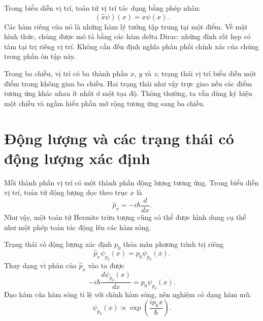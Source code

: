 Trong biểu diễn vị trí, toán tử vị trí tác dụng bằng phép nhân:
\begin{equation}
(\hat x\psi)(x)=x\psi(x).
\end{equation}
Các hàm riêng của nó là những hàm lý tưởng tập trung tại một điểm. Về mặt hình thức, chúng được mô tả bằng các hàm delta Dirac: những đỉnh rất hẹp có tâm tại trị riêng vị trí. Không cần đến định nghĩa phân phối chính xác của chúng trong phần ôn tập này.

Trong ba chiều, vị trí có ba thành phần \(x\), \(y\) và \(z\); trạng thái vị trí biểu diễn một điểm trong không gian ba chiều. Hai trạng thái như vậy trực giao nếu các điểm tương ứng khác nhau ít nhất ở một tọa độ. Thông thường, ta vẫn dùng ký hiệu một chiều và ngầm hiểu phần mở rộng tương ứng sang ba chiều.

\section{Động lượng và các trạng thái có động lượng xác định}

Mỗi thành phần vị trí có một thành phần động lượng tương ứng. Trong biểu diễn vị trí, toán tử động lượng dọc theo trục \(x\) là
\begin{equation}
\hat p_x=-i\hbar\frac{d}{dx}.
\end{equation}
Như vậy, một toán tử Hermite trừu tượng cũng có thể được hình dung cụ thể như một phép toán tác động lên các hàm sóng.

Trạng thái có động lượng xác định \(p_0\) thỏa mãn phương trình trị riêng
\begin{equation}
\hat p_x\psi_{p_0}(x)=p_0\psi_{p_0}(x).
\end{equation}
Thay dạng vi phân của \(\hat p_x\) vào ta được
\begin{equation}
-i\hbar\frac{d\psi_{p_0}(x)}{dx}
=p_0\psi_{p_0}(x).
\end{equation}
Đạo hàm của hàm sóng tỉ lệ với chính hàm sóng, nên nghiệm có dạng hàm mũ:
\begin{equation}
\psi_{p_0}(x)\propto
\exp\left(\frac{ip_0x}{\hbar}\right).
\end{equation}

\begin{classroomqa}
\end{classroomqa}

